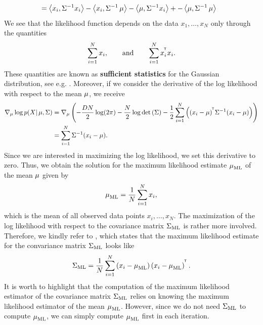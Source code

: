 \begin{example}
\begin{align*}
&= \left\langle x_i, \S^{-1}x_i \right\rangle - \left\langle x_i, \S^{-1} \m \right\rangle - \left\langle \m, \S^{-1}x_i \right\rangle + - \left\langle \m, \S^{-1}\m \right\rangle
\end{align*}
We see that the likelihood function depends on the data $x_1,\ldots, x_N$ only through the quantities
\begin{align*}
\sum_{i=1}^N x_i, \qquad\text{and} \qquad \sum_{i=1}^N x_i^{\tran}x_i.
\end{align*}
These quantities are known as \textbf{sufficient statistics} for the Gaussian distribution, see e.g. \cite[Definition~15.8]{meintrup2006stochastik}. Moreover, if we consider the derivative of the log likelihood with respect to the mean $\m$, we receive
\begin{align*}
\nabla_{\m} \log p(X| \m, \S) &= \nabla_{\m} \left( -\frac{DN}{2}\log(2\pi) - \frac{N}{2} \log \det\left(\S\right) - \frac{1}{2} \sum_{i=1}^N \left( (x_i - \m)^{\tran}\S^{-1} (x_i - \m) \right) \right)\\
&= \sum_{i=1}^N \S^{-1} (x_i-\m).
\end{align*}
Since we are interested in maximizing the log likelihood, we set this derivative to zero. Thus, we obtain the solution for the maximum likelihood estimate $\m_{\text{ML}}$ of the mean $\m$ given by
\begin{align*}
\m_{\text{ML}} = \frac{1}{N} \sum_{i=1}^N x_i,
\end{align*}
which is the mean of all observed data points $x_i,\ldots, x_N$. The maximization of the log likelihood with respect to the covariance matrix $\S_{\text{ML}}$ is rather more involved. Therefore, we kindly refer to \cite[Chapter~15.3, Theorem~1]{magnus2019matrix}, which states that the maximum likelihood estimate for the convariance matrix $\S_{\text{ML}}$ looks like
\begin{align*}
\S_{\text{ML}} = \frac{1}{N} \sum_{i=1}^N \left( x_i - \m_{\text{ML}} \right)\left( x_i - \m_{\text{ML}} \right)^{\tran}.
\end{align*}
It is worth to highlight that the computation of the maximum likelihood estimator of the covariance matrix $\S_{\text{ML}}$ relies on knowing the maximum likelihood estimator of the mean $\m_{\text{ML}}$. However, since we do not need $\S_{\text{ML}}$ to compute $\m_{\text{ML}}$, we can simply compute $\m_{\text{ML}}$ first in each iteration.
\end{example}

